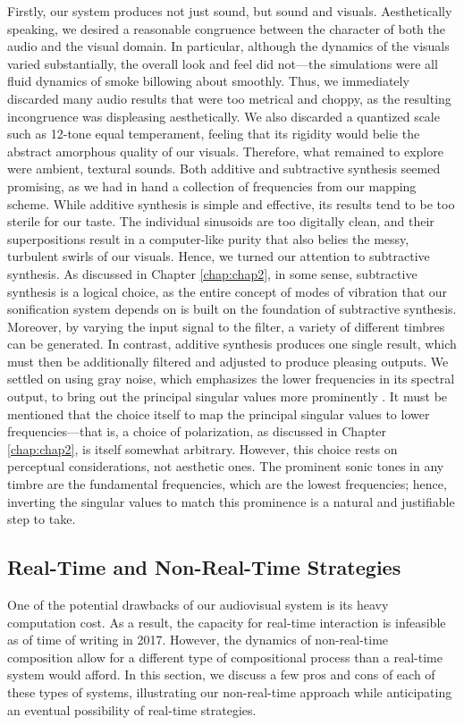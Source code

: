 Firstly, our system produces not just sound, but sound and visuals. Aesthetically speaking, we desired a reasonable congruence between the character of both the audio and the visual domain. In particular, although the dynamics of the visuals varied substantially, the overall look and feel did not---the simulations were all fluid dynamics of smoke billowing about smoothly. Thus, we immediately discarded many audio results that were too metrical and choppy, as the resulting incongruence was displeasing aesthetically. We also discarded a quantized scale such as 12-tone equal temperament, feeling that its rigidity would belie the abstract amorphous quality of our visuals. Therefore, what remained to explore were ambient, textural sounds. Both additive and subtractive synthesis seemed promising, as we had in hand a collection of frequencies from our mapping scheme. While additive synthesis is simple and effective, its results tend to be too sterile for our taste. The individual sinusoids are too digitally clean, and their superpositions result in a computer-like purity that also belies the messy, turbulent swirls of our visuals. Hence, we turned our attention to subtractive synthesis. As discussed in Chapter \ref{chap:chap2}, in some sense, subtractive synthesis is a logical choice, as the entire concept of modes of vibration that our sonification system depends on is built on the foundation of subtractive synthesis. Moreover, by varying the input signal to the filter, a variety of different timbres can be generated. In contrast, additive synthesis produces one single result, which must then be additionally filtered and adjusted to produce pleasing outputs. We settled on using gray noise, which emphasizes the lower frequencies in its spectral output, to bring out the principal singular values more prominently \cite{wilson2011supercollider}. It must be mentioned that the choice itself to map the principal singular values to lower frequencies---that is, a choice of polarization, as discussed in Chapter \ref{chap:chap2}, is itself somewhat arbitrary. However, this choice rests on perceptual considerations, not aesthetic ones. The prominent sonic tones in any timbre are the fundamental frequencies, which are the lowest frequencies; hence, inverting the singular values to match this prominence is a natural and justifiable step to take.

\subsection{Real-Time and Non-Real-Time Strategies}
One of the potential drawbacks of our audiovisual system is its heavy computation cost. As a result, the capacity for real-time interaction is infeasible as of time of writing in 2017. However, the dynamics of non-real-time composition allow for a different 
type of compositional process than a real-time system would afford. In this section, we discuss a few pros and cons of each of these types of systems, illustrating our non-real-time approach while anticipating an eventual possibility of real-time strategies.

